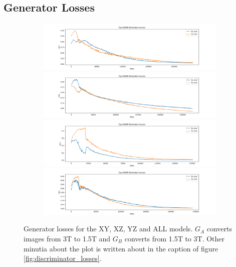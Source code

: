\documentclass[12pt, fleqn, titlepage]{article}
\newcommand{\1}[1]{\mathds{1}\left[#1\right]}
\begin{document}
\subsection{Generator Losses}\label{gen_loss}
\begin{figure}[H]
	\centering
	\begin{subfigure}[b]{0.8\textwidth}
		\centering
		\includegraphics[width=\linewidth]{imgs/generator_losses/XY_model_generator_losses}
		\hfill
		\includegraphics[width=\linewidth]{imgs/generator_losses/XZ_model_generator_losses}
		\hfill
		\includegraphics[width=\linewidth]{imgs/generator_losses/YZ_model_generator_losses}
		\hfill
		\includegraphics[width=\linewidth]{imgs/generator_losses/ALL_model_generator_losses}
	\end{subfigure}
	\caption{Generator losses for the XY, XZ, YZ and ALL models. $G_A$ converts images from 3T to 1.5T and $G_B$ converts from 1.5T to 3T. Other minutia about the plot is written about in the caption of figure \ref{fig:discriminator_losses}.}
	\label{fig:generator_losses}
\end{figure}
\end{document}
